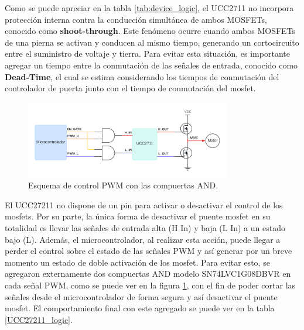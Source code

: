 \documentclass[11pt]{report}
\begin{document}
\newpage
Como se puede apreciar en la tabla \ref{tab:device_logic}, el UCC2711 no incorpora protección interna contra la conducción simultánea de ambos MOSFETs, conocido como \textbf{shoot-through}. Este fenómeno ocurre cuando ambos MOSFETs de una pierna se activan y conducen al mismo tiempo, generando un cortocircuito entre el suministro de voltaje y tierra. Para evitar esta situación, es importante agregar un tiempo entre la conmutación de las señales de entrada, conocido como \textbf{Dead-Time}, el cual se estima considerando los tiempos de conmutación del controlador de puerta junto con el tiempo de conmutación del mosfet.

\begin{figure}[ht]
	\centering
	\includegraphics[width=0.8\textwidth]{imagenes/Diagramas/Diagramas - AND.png}
	\caption{Esquema de control PWM con las compuertas AND.}
	\label{fig:control-pwm-and}
\end{figure}
\FloatBarrier

El UCC27211 no dispone de un pin para activar o desactivar el control de los mosfets. Por su parte, la única forma de desactivar el puente mosfet en su totalidad es llevar las señales de entrada alta (H In) y baja (L In) a un estado bajo (L). Además, el microcontrolador, al realizar esta acción, puede llegar a perder el control sobre el estado de las señales PWM y así generar por un breve momento un estado de doble activación de los mosfet. Para evitar esto, se agregaron externamente dos compuertas AND modelo SN74LVC1G08DBVR en cada señal PWM, como se puede ver en la figura \ref{fig:control-pwm-and}, con el fin de poder cortar las señales desde el microcontrolador de forma segura y así desactivar el puente mosfet. El comportamiento final con este agregado se puede ver en la tabla \ref{UCC27211_logic}.
\end{document}
